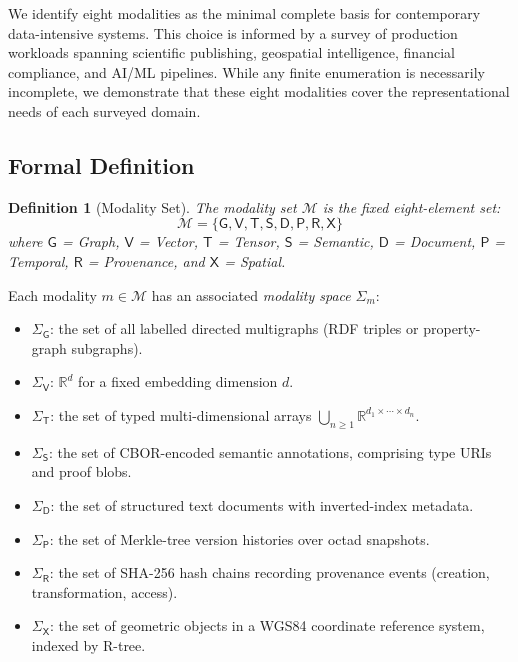 \documentclass[11pt,twocolumn]{article}
\newtheorem{definition}{Definition}[section]
\newcommand{\modset}{\mathcal{M}}
\begin{document}
We identify eight modalities as the minimal complete basis for contemporary
data-intensive systems.  This choice is informed by a survey of production
workloads spanning scientific publishing, geospatial intelligence, financial
compliance, and AI/ML pipelines.  While any finite enumeration is necessarily
incomplete, we demonstrate that these eight modalities cover the representational
needs of each surveyed domain.

\subsection{Formal Definition}

\begin{definition}[Modality Set]\label{def:modset}
The \emph{modality set} $\modset$ is the fixed eight-element set:
\[
  \modset = \{
    \mathsf{G}, \mathsf{V}, \mathsf{T}, \mathsf{S},
    \mathsf{D}, \mathsf{P}, \mathsf{R}, \mathsf{X}
  \}
\]
where $\mathsf{G}$ = Graph, $\mathsf{V}$ = Vector, $\mathsf{T}$ = Tensor,
$\mathsf{S}$ = Semantic, $\mathsf{D}$ = Document, $\mathsf{P}$ = Temporal,
$\mathsf{R}$ = Provenance, and $\mathsf{X}$ = Spatial.
\end{definition}

Each modality $m \in \modset$ has an associated \emph{modality space} $\Sigma_m$:

\begin{itemize}[leftmargin=*]
  \item $\Sigma_\mathsf{G}$: the set of all labelled directed multigraphs
    (RDF triples or property-graph subgraphs).
  \item $\Sigma_\mathsf{V}$: $\mathbb{R}^d$ for a fixed embedding dimension $d$.
  \item $\Sigma_\mathsf{T}$: the set of typed multi-dimensional arrays
    $\bigcup_{n \geq 1} \mathbb{R}^{d_1 \times \cdots \times d_n}$.
  \item $\Sigma_\mathsf{S}$: the set of CBOR-encoded semantic annotations,
    comprising type URIs and proof blobs.
  \item $\Sigma_\mathsf{D}$: the set of structured text documents with
    inverted-index metadata.
  \item $\Sigma_\mathsf{P}$: the set of Merkle-tree version histories over
    octad snapshots.
  \item $\Sigma_\mathsf{R}$: the set of SHA-256 hash chains recording
    provenance events (creation, transformation, access).
  \item $\Sigma_\mathsf{X}$: the set of geometric objects in a WGS84
    coordinate reference system, indexed by R-tree.
\end{itemize}
\end{document}
